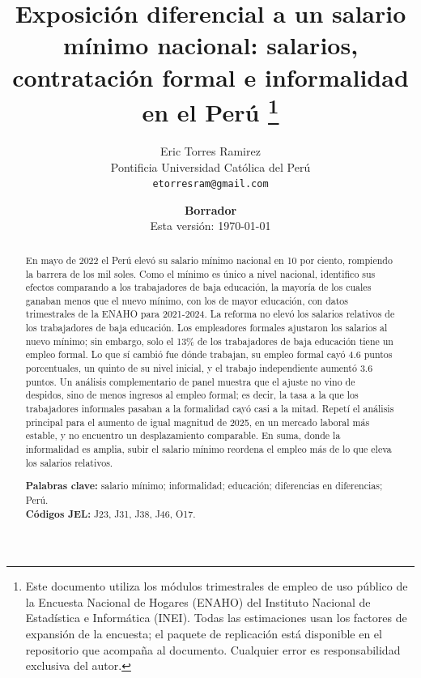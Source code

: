 \documentclass[12pt]{article}
\title{\textbf{Exposición diferencial a un salario mínimo nacional: salarios, contratación formal e informalidad en el Perú} \thanks{Este documento utiliza los módulos trimestrales de empleo de uso público de la Encuesta Nacional de Hogares (ENAHO) del Instituto Nacional de Estadística e Informática (INEI). Todas las estimaciones usan los factores de expansión de la encuesta; el paquete de replicación está disponible en el repositorio que acompaña al documento. Cualquier error es responsabilidad exclusiva del autor.}}
\author{Eric Torres Ramirez\\
  \small Pontificia Universidad Católica del Perú\\
  \small \texttt{etorresram@gmail.com}}
\date{\textbf{Borrador}\\ Esta versión: \today}
\begin{document}
\maketitle

\begin{abstract}
\noindent En mayo de 2022 el Perú elevó su salario mínimo nacional en 10 por ciento, rompiendo la barrera de los mil soles. Como el mínimo es único a nivel nacional, identifico sus efectos comparando a los trabajadores de baja educación, la mayoría de los cuales ganaban menos que el nuevo mínimo, con los de mayor educación, con datos trimestrales de la ENAHO para 2021-2024. La reforma no elevó los salarios relativos de los trabajadores de baja educación. Los empleadores formales ajustaron los salarios al nuevo mínimo; sin embargo, solo el 13\% de los trabajadores de baja educación tiene un empleo formal. Lo que sí cambió fue dónde trabajan, su empleo formal cayó 4.6 puntos porcentuales, un quinto de su nivel inicial, y el trabajo independiente aumentó 3.6 puntos. Un análisis complementario de panel muestra que el ajuste no vino de despidos, sino de menos ingresos al empleo formal; es decir, la tasa a la que los trabajadores informales pasaban a la formalidad cayó casi a la mitad. Repetí el análisis principal para el aumento de igual magnitud de 2025, en un mercado laboral más estable, y no encuentro un desplazamiento comparable. En suma, donde la informalidad es amplia, subir el salario mínimo reordena el empleo más de lo que eleva los salarios relativos.

\medskip
\noindent\textbf{Palabras clave:} salario mínimo; informalidad; educación; diferencias en diferencias; Perú.\\
\noindent\textbf{Códigos JEL:} J23, J31, J38, J46, O17.
\end{abstract}

\newpage
{}












\newpage


\newpage
\appendix

\end{document}
